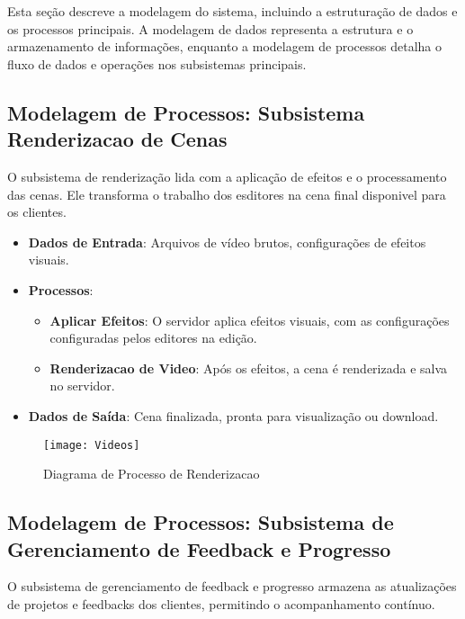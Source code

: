 Esta seção descreve a modelagem do sistema, incluindo a estruturação de dados e os processos principais. A modelagem de dados representa a estrutura e o armazenamento de informações, enquanto a modelagem de processos detalha o fluxo de dados e operações nos subsistemas principais.

\subsection{Modelagem de Processos: Subsistema Renderizacao de Cenas}
O subsistema de renderização lida com a aplicação de efeitos e o processamento das cenas. Ele transforma o trabalho dos esditores na cena final disponivel para os clientes.

\begin{itemize}
    \item \textbf{Dados de Entrada}: Arquivos de vídeo brutos, configurações de efeitos visuais.
    \item \textbf{Processos}:
        \begin{itemize}
            \item \textbf{Aplicar Efeitos}: O servidor aplica efeitos visuais, com as configurações configuradas pelos editores na edição.
            \item \textbf{Renderizacao de Video}: Após os efeitos, a cena é renderizada e salva no servidor.
        \end{itemize}
    \item \textbf{Dados de Saída}: Cena finalizada, pronta para visualização ou download.
\end{itemize}

\begin{figure}[ht]
    \centering
    \texttt{[image: Videos]}
    \caption{Diagrama de Processo de Renderizacao}
    \label{fig:diagram1}
\end{figure}

\pagebreak
\newpage

\subsection{Modelagem de Processos: Subsistema de Gerenciamento de Feedback e Progresso}
O subsistema de gerenciamento de feedback e progresso armazena as atualizações de projetos e feedbacks dos clientes, permitindo o acompanhamento contínuo.


